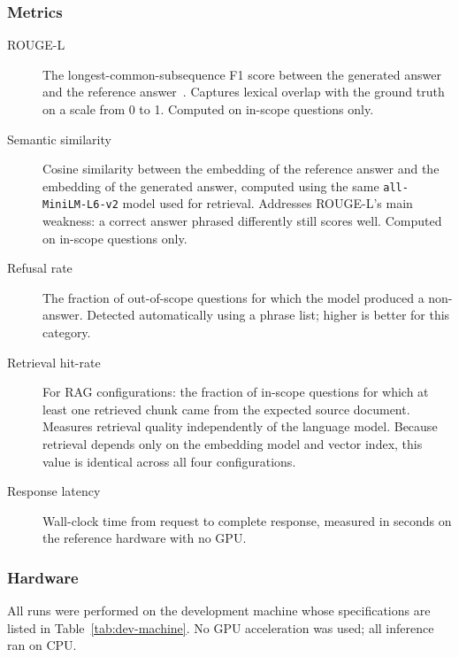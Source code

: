 \subsubsection*{Metrics}

\begin{description}
    \item[ROUGE-L] The longest-common-subsequence F1 score between the
        generated answer and the reference answer~\cite{lin2004rouge}. Captures
        lexical overlap with the ground truth on a scale from 0 to 1. Computed
        on in-scope questions only.

    \item[Semantic similarity] Cosine similarity between the embedding of the
        reference answer and the embedding of the generated answer, computed
        using the same \texttt{all-MiniLM-L6-v2} model used for retrieval.
        Addresses ROUGE-L's main weakness: a correct answer phrased differently
        still scores well. Computed on in-scope questions only.

    \item[Refusal rate] The fraction of out-of-scope questions for which the
        model produced a non-answer. Detected automatically using a phrase list;
        higher is better for this category.

    \item[Retrieval hit-rate] For RAG configurations: the fraction of in-scope
        questions for which at least one retrieved chunk came from the expected
        source document. Measures retrieval quality independently of the
        language model. Because retrieval depends only on the embedding model
        and vector index, this value is identical across all four configurations.

    \item[Response latency] Wall-clock time from request to complete response,
        measured in seconds on the reference hardware with no GPU.
\end{description}

\subsubsection*{Hardware}

All runs were performed on the development machine whose specifications are
listed in Table~\ref{tab:dev-machine}. No GPU acceleration was used; all
inference ran on CPU.


